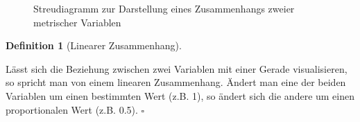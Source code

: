 \documentclass[
  letterpaper,
  oneside,
  open=any]{scrbook}
\theoremstyle{definition}
\theoremstyle{definition}
\theoremstyle{definition}
\newtheorem{definition}{Definition}[chapter]
\theoremstyle{remark}
\begin{document}
\begin{figure}

\begin{minipage}{0.50\linewidth}



\end{minipage}%
%
\begin{minipage}{0.50\linewidth}



\end{minipage}%

\caption{\label{fig-streu1}Streudiagramm zur Darstellung eines
Zusammenhangs zweier metrischer Variablen}

\end{figure}%

\begin{definition}[Linearer
Zusammenhang]\protect\hypertarget{def-lin-zshg}{}\label{def-lin-zshg}

Lässt sich die Beziehung zwischen zwei Variablen mit einer Gerade
visualisieren, so spricht man von einem linearen Zusammenhang. Ändert
man eine der beiden Variablen um einen bestimmten Wert (z.B. 1), so
ändert sich die andere um einen proportionalen Wert (z.B. 0.5).
\(\square\)

\end{definition}
\end{document}
